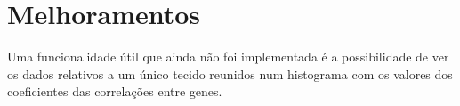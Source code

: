\section{Melhoramentos}

Uma funcionalidade útil que ainda não foi implementada é a possibilidade de ver os dados relativos a um único tecido reunidos num histograma com os valores dos coeficientes das correlações entre genes.

\newpage
